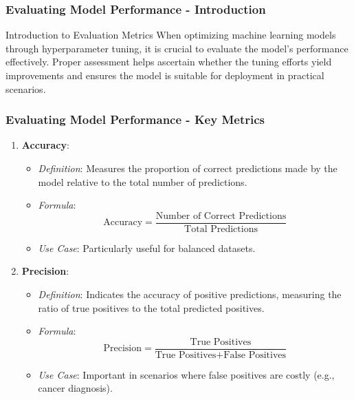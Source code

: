 \documentclass[aspectratio=169]{beamer}
\begin{document}
\begin{frame}[fragile]
    \frametitle{Evaluating Model Performance - Introduction}
    \begin{block}{Introduction to Evaluation Metrics}
        When optimizing machine learning models through hyperparameter tuning, it is crucial to evaluate the model's performance effectively. Proper assessment helps ascertain whether the tuning efforts yield improvements and ensures the model is suitable for deployment in practical scenarios.
    \end{block}
\end{frame}

\begin{frame}[fragile]
    \frametitle{Evaluating Model Performance - Key Metrics}
    \begin{enumerate}
        \item \textbf{Accuracy}:
        \begin{itemize}
            \item \textit{Definition}: Measures the proportion of correct predictions made by the model relative to the total number of predictions.
            \item \textit{Formula}: 
            \[
            \text{Accuracy} = \frac{\text{Number of Correct Predictions}}{\text{Total Predictions}}
            \]
            \item \textit{Use Case}: Particularly useful for balanced datasets.
        \end{itemize}

        \item \textbf{Precision}:
        \begin{itemize}
            \item \textit{Definition}: Indicates the accuracy of positive predictions, measuring the ratio of true positives to the total predicted positives.
            \item \textit{Formula}:
            \[
            \text{Precision} = \frac{\text{True Positives}}{\text{True Positives} + \text{False Positives}}
            \]
            \item \textit{Use Case}: Important in scenarios where false positives are costly (e.g., cancer diagnosis).
        \end{itemize}
    \end{enumerate}
\end{frame}
\end{document}
